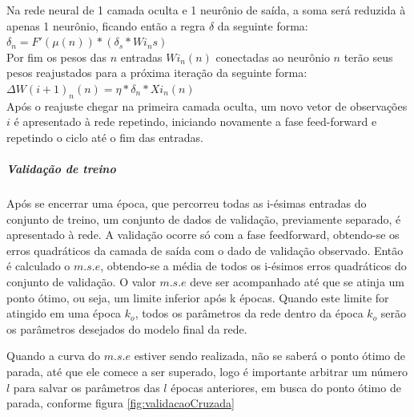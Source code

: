 \documentclass[	12pt, Times, openright, twoside, a4paper, english, brazil]{abntex2}
\begin{document}
            Na rede neural de 1 camada oculta e 1 neurônio de saída, a soma será reduzida à apenas 1 neurônio, ficando então a regra $\delta$ da seguinte forma:\\
            
            $\delta_n = F'(\mu(n))*(\delta_s*Wi_{n}s)$\\
            
            Por fim os pesos das $n$ entradas $Wi_{n}(n)$ conectadas ao neurônio $n$ terão seus pesos reajustados para a próxima iteração da seguinte forma:\\
            $\Delta W(i+1)_{n}(n) = \eta*\delta_n*Xi_{n}(n)$\\
            
            Após o reajuste chegar na primeira camada oculta, um novo vetor de observações $i$ é apresentado à rede repetindo, iniciando novamente a fase feed-forward e repetindo o ciclo até o fim das entradas.
            
            \subparagraph{Validação de treino}
                Após se encerrar uma época, que percorreu todas as i-ésimas entradas do conjunto de treino, um conjunto de dados de validação, previamente separado, é apresentado à rede.
                A validação ocorre só com a fase feedforward, obtendo-se os erros quadráticos da camada de saída com o dado de validação observado.
                Então é calculado o $m.s.e$, obtendo-se a média de todos os i-ésimos erros quadráticos do conjunto de validação.
                O valor $m.s.e$ deve ser acompanhado até que se atinja um ponto ótimo, ou seja, um limite inferior após k épocas.
                Quando este limite for atingido em uma época $k_o$, todos os parâmetros da rede dentro da época $k_o$ serão os parâmetros desejados do modelo final da rede.
                
                Quando a curva do $m.s.e$ estiver sendo realizada, não se saberá o ponto ótimo de parada, até que ele comece a ser superado, logo é importante arbitrar um número $l$ para salvar os parâmetros das $l$ épocas anteriores, em busca do ponto ótimo de parada, conforme figura \ref{fig:validacaoCruzada}
        
\end{document}
